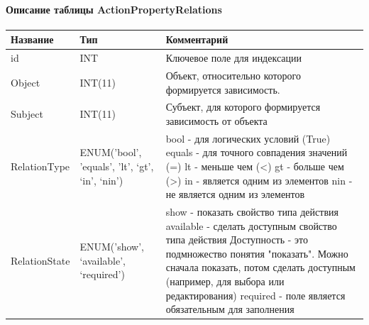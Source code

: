 \documentclass[a4paper,8pt]{report} %
\begin{document}
{    \paragraph*{Описание таблицы ActionPropertyRelations}
    \begin{tabularx}{\textwidth}{ |X|X|X| }
        \hline
        \textbf{Название} & \textbf{Тип} & \textbf{Комментарий} \\
        \hline
        id      &   INT     &   Ключевое поле для индексации \\
        \hline
        Object  &   INT(11) &   Объект, относительно которого формируется зависимость. \\
        \hline
        Subject &   INT(11) &   Субъект, для которого формируется зависимость от объекта \\
        \hline
        RelationType & ENUM('bool', 'equals', 'lt', ‘gt’, ‘in’, ‘nin’) &
            bool - для логических условий (True)
            equals - для точного совпадения значений (=)
            lt - меньше чем (<)
            gt - больше чем (>)
            in - является одним из элементов
            nin - не является одним из элементов \\
        RelationState & ENUM('show', ‘available’,
        ‘required’) &
            show - показать свойство типа действия
            available - сделать доступным свойство типа действия
                Доступность - это подмножество понятия "показать". Можно сначала показать, потом сделать доступным
                (например, для выбора или редактирования)
            required - поле является обязательным для заполнения \\
        \hline
     \end{tabularx}

}
\end{document}
